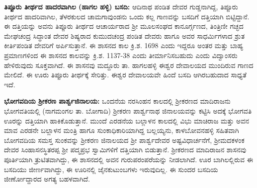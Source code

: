 \textbf{ತಿಪ್ಪೂರು ತೀರ್ಥದ ಹಾದರವಾಗಿಲ (ಹಾಗಲ ಹಳ್ಳಿ) ಬಸದಿ:} ಆದಿನಾಥ ಪಂಡಿತ ದೇವರ ಗುಡ್ಡನಾಗಿದ್ದ, ತಿಪ್ಪೂರು ತೀರ್ಥದ ಹಾದರಿವಾಗಿಲ, ತೆಳರಕುಲದ ಚಾಮಗಾವುಂಡನು ಒಂದು ಕಲ್ಲ ಗಾಣವನ್ನು ಬಸದಿಗೆ ದತ್ತಿಯಾಗಿ ಬಿಟ್ಟಿದ್ದಾನೆ. ಈ ದತ್ತಿಯನ್ನು ಅವನು ತಿಪ್ಪೂರು ತೀರ್ಥದ ಆಚಾರ್ಯರಾದ ಶ‍್ರೀ ಮೂಲಸಂಘದ ಕಾನೂರ್ಗ್ಗಣದ, ತಿಂತ್ರಿಣೀ ಗಚ್ಛದ ಮೇಘಚಂದ್ರ ಸಿದ್ಧಾಂತ ದೇವರ ಶಿಷ್ಯರಾದ ಕುಮುದಚಂದ್ರ ಪಂಡಿತ ದೇವರು ಹಾಗೂ ಅವರ ಸಾಧರ್ಮಿಗಳಾದ ಶ್ರುತ ಕೀರ್ತಿ\-ಪಂಡಿತ ದೇವರಿಗೆ ಅರ್ಪಿಸುತ್ತಾನೆ. ಈ ಶಾಸನದ ಕಾಲ ಕ್ರಿ.ಶ. 1698 ಎಂದು ಇದ್ದರೂ ಅಂತರ ಮತ್ತು ಬಾಹ್ಯ ಪ್ರಮಾಣಗಳಿಂದ ಈ ಶಾಸನದ ಕಾಲವನ್ನು ಕ್ರಿ.ಶ. 1137-38 ಎಂದು ತೀರ್ಮಾನಿಸಬಹುದು ಎಂದು ವಿದ್ವಾಂಸರು ಹೇಳಿರುವುದು ಸೂಕ್ತವಾಗಿದೆ. ಈ ಶಾಸನವು ಮದ್ದೂರು ತಾ. ಹಾಗಲಹಳ್ಳಿ ಈಶ್ವರ ದೇವಾಲಯದ ಮುಂದಿರುವ ಗಾಣದ ಮೇಲಿದೆ. ಈ ಊರು ತಿಪ್ಪೂರು ತೀರ್ಥಕ್ಕೆ ಸೇರಿತ್ತು. ಈಶ್ವರ ದೇವಾಲಯವೇ ಹಿಂದೆ ಬಸದಿ ಆಗಿರಬಹುದಾದ ಸಾಧ್ಯತೆ ಇದೆ.

\textbf{ಭೋಗವದಿಯ ಶ‍್ರೀಕರಣ ಪಾರ್ಶ್ವಜಿನಾಲಯ: } ಒಂದನೆಯ ನರಸಿಂಹನ ಕಾಲದಲ್ಲಿ ಶ‍್ರೀಕರಣದ ಮಾದಿರಾಜನು ಭೋಗವತಿಯಲ್ಲಿ (ನಾಗಮಂಗಲ ತಾ. ಬೋಗಾದಿ) ಶ‍್ರೀಕರಣ ಪಾರ್ಶ್ವನಾಥ ಜಿನಾಲಯವನ್ನು ಕಟ್ಟಿಸಿ ಅದಕ್ಕೆ ಭೋಗವತಿ ಊರನ್ನು ದತ್ತಿಯಾಗಿ ಹಾಕಿಕೊಡುತ್ತಾನೆ. ಮುಂದೆ ಎರಡನೆಯ ಬಲ್ಲಾಳನ ಕಾಲದಲ್ಲಿ ವಿಭು ಮಾಚಿರಾಜ ಮತ್ತು ಅವನ ಮಾವ ಎರಡನೇ ಬಲ್ಲಾಳನ ಮಂತ್ರಿ ಹಾಗೂ ಸುಂಕಾಧಿಕಾರಿಯಾಗಿದ್ದ ಬಲ್ಲಯ್ಯನು, ಕಾಳಬೋವನಹಳ್ಳಿ ಸಹಿತವಾಗಿ ಬೋಗವದಿಯ ಸಮಸ್ತ ಸುಂಕವನ್ನು ಶ‍್ರೀಕರಣ ಜಿನಾಲಯದ ಶ‍್ರೀ ಪಾರ್ಶ್ವದೇವರ ಅಷ್ಟವಿಧಾರ್ಚನೆಗೆ, ಶ‍್ರೀಮದಕಳಂಕ ದೇವರ ಸಿಂಹಾಸನಸ್ಥಿತರಪ್ಪ ಶ‍್ರೀ ಪದ್ಮಪ್ರಭ ಸ್ವಾಮಿಗಳಿಗೆ ದತ್ತಿಯಾಗಿ ಬಿಡುತ್ತಾನೆ. ಶ‍್ರೀಕರಣದ ಮಾದಿರಾಜನ ಶಾಸನವು ಪೂರ್ತಿಯಾಗಿ ತ್ರುಟಿತವಾಗಿದ್ದು, ಈ ಶಾಸನದಲ್ಲಿ ಅವನ ಗುರುಪರಂಪರೆಯನ್ನು ನೀಡಲಾಗಿದೆ. ಊರ ಬಾಗಿಲಲ್ಲಿರುವ ಈ ಬಸದಿಯು ಜೀರ್ಣವಾಗಿದ್ದು, ಈ ಊರಿನಲ್ಲಿ ಜೈನಕುಟುಂಬಗಳು ಇರುವುದಿಲ್ಲ. ಈ ಸುಂದರ ಬಸದಿಯ ಜೀರ್ಣೋದ್ದಾರದ ಅಗತ್ಯ ಬಹಳವಾಗಿದೆ.

